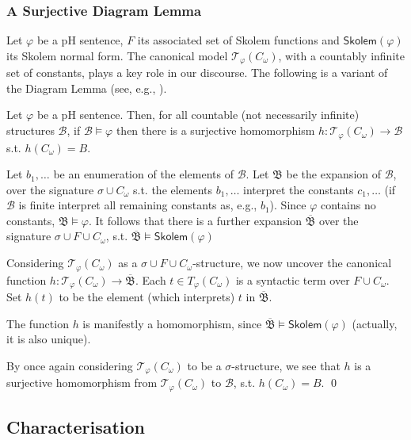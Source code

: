\documentclass{LMCS}
\newcommand{\skolem}[0]{\ensuremath{\mathsf{Skolem}}}
\begin{document}
\subsubsection{A Surjective Diagram Lemma}

Let $\varphi$ be a pH sentence, $F$ its associated set of Skolem functions and $\skolem(\varphi)$ its Skolem normal form. The canonical model $\mathcal{T}_\varphi(C_\omega)$, with a countably infinite set of constants, plays a key role in our discourse.
The following is a variant of the Diagram Lemma (see, e.g., \cite{Hodges}).
\begin{lem}
\label{lemma:surjective-diagram}
Let $\varphi$ be a pH sentence. Then, for all countable (not necessarily infinite) structures $\mathcal{B}$, if $\mathcal{B} \models \varphi$ then there is a surjective homomorphism $h:\mathcal{T}_\varphi(C_\omega) \rightarrow \mathcal{B}$ s.t. $h(C_\omega)=B$.
\end{lem}
\proof
Let $b_1,\ldots$ be an enumeration of the elements of $\mathcal{B}$. Let $\mathfrak{B}$ be the expansion of $\mathcal{B}$, over the signature $\sigma \cup C_\omega$ s.t. the elements $b_1,\ldots$ interpret the constants $c_1,\ldots$ (if $\mathcal{B}$ is finite interpret all remaining constants as, e.g., $b_1$). Since $\varphi$ contains no constants, $\mathfrak{B} \models \varphi$. It follows that there is a further expansion $\overline{\mathfrak{B}}$ over the signature $\sigma \cup F \cup C_\omega$, s.t. $\overline{\mathfrak{B}} \models  \skolem(\varphi)$

Considering $\mathcal{T}_\varphi(C_\omega)$ as a $\sigma \cup F \cup C_\omega$-structure, we now uncover the canonical function $h:\mathcal{T}_\varphi(C_\omega) \rightarrow \overline{\mathfrak{B}}$. Each $t \in T_\varphi(C_\omega)$ is a syntactic term over $F \cup C_\omega$. Set $h(t)$ to be the element (which interprets) $t$ in $\overline{\mathfrak{B}}$.

The function $h$ is manifestly a homomorphism, since $\overline{\mathfrak{B}} \models \skolem(\varphi)$ (actually, it is also unique).  

By once again considering $\mathcal{T}_\varphi(C_\omega)$ to be a $\sigma$-structure, we see that $h$ is a surjective homomorphism from $\mathcal{T}_\varphi(C_\omega)$ to $\mathcal{B}$, s.t. $h(C_\omega)=B$.
\qed

\subsection{Characterisation}
\label{LHS:sec:characterisation}
\end{document}
